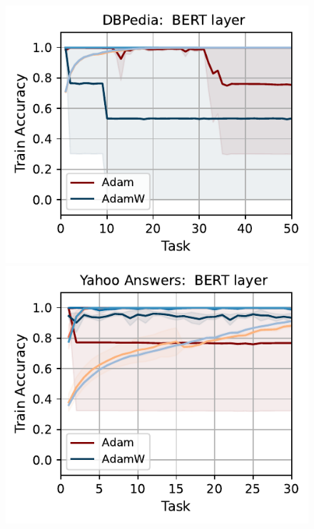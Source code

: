 \begin{figure}[t]
{    \includegraphics[width=\textwidth]{figs/Accuracy/nlp/bert_layer/dbpedia_40.pdf}
    \includegraphics[width=\textwidth]{figs/Accuracy/nlp/bert_layer/yahoo_answers_40.pdf}
}
\end{figure}
